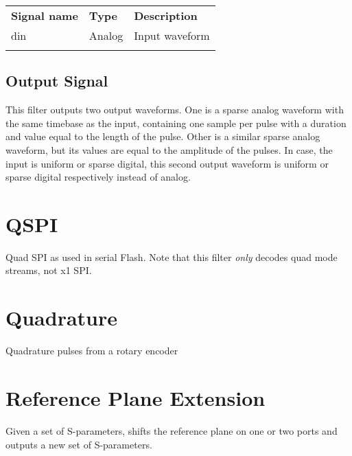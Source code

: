 \begin{tabularx}{16cm}{llX}
\thickhline
\textbf{Signal name} & \textbf{Type} & \textbf{Description} \\
\thickhline
din & Analog & Input waveform \\
\thickhline
\end{tabularx}

\subsection{Output Signal}

This filter outputs two output waveforms. One is a sparse analog waveform with the same timebase as the input, containing one sample per pulse with
a duration and value equal to the length of the pulse. Other is a similar sparse analog waveform, but its values are equal to the amplitude of the pulses. In case,
the input is uniform or sparse digital, this second output waveform is uniform or sparse digital respectively instead of analog.

\pagebreak
\section{QSPI}

Quad SPI as used in serial Flash. Note that this filter \emph{only} decodes quad mode streams, not x1 SPI.

\pagebreak
\section{Quadrature}

Quadrature pulses from a rotary encoder

\pagebreak
\section{Reference Plane Extension}

Given a set of S-parameters, shifts the reference plane on one or two ports and outputs a new set of S-parameters.

\pagebreak
